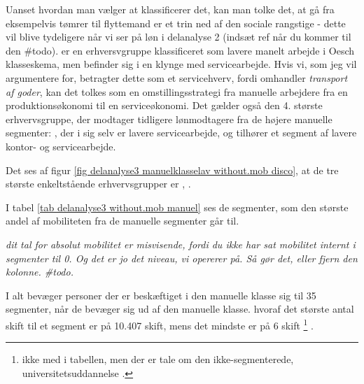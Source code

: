 Uanset hvordan man vælger at klassificerer det, kan man tolke det, at gå fra eksempelvis tømrer til flyttemand er et trin ned af den sociale rangstige - dette vil blive tydeligere når vi ser på løn i delanalyse 2 (indsæt ref når du kommer til den \#todo).  er en erhversvgruppe klassificeret som lavere manelt arbejde i Oesch klasseskema, men befinder sig i en klynge med servicearbejde. Hvis vi, som jeg vil argumentere for, betragter dette som et servicehverv, fordi omhandler \emph{transport af goder}, kan det tolkes som en omstillingsstrategi fra manuelle arbejdere fra en produktionsøkonomi til en serviceøkonomi. Det gælder også den 4. største erhvervsgruppe, der modtager tidligere lønmodtagere fra de højere manuelle segmenter: , der i sig selv er lavere servicearbejde, og tilhører et segment af lavere kontor- og servicearbejde.










Det ses af figur \ref{fig delanalyse3 manuelklasselav without.mob disco}, at de tre største enkeltstående erhvervsgrupper er ,  .












 
% 







I tabel \ref{tab delanalyse3 without.mob manuel} ses de segmenter, som den største andel af mobiliteten fra de manuelle segmenter går til.  

%

%
\emph{dit tal for absolut mobilitet er misvisende, fordi du ikke har sat mobilitet internt i segmenter til 0. Og det er jo det niveau, vi opererer på. Så gør det, eller fjern den kolonne. \#todo.}

I alt bevæger personer der er beskæftiget i den manuelle klasse sig til 35 segmenter, når de bevæger sig ud af den manuelle klasse. hvoraf det største antal skift til et segment er på 10.407 skift, mens det mindste er på 6 skift%
%
    \footnote{ ikke med i tabellen, men der er tale om den ikke-segmenterede, universitetsuddannelse .}%
%
. 

